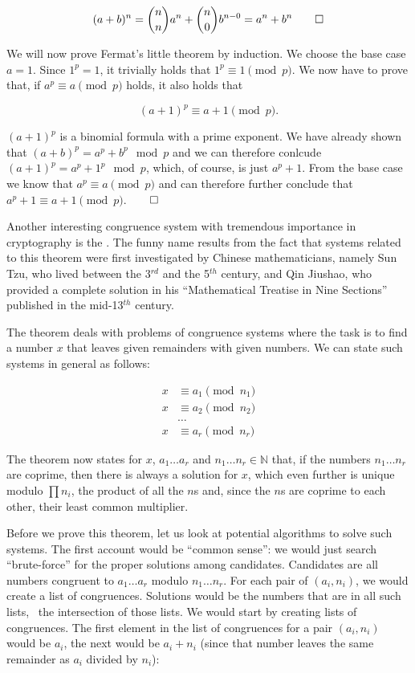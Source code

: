 \documentclass{scrreprt}
\begin{document}
\[
(a + b)^n = \binom{n}{n}a^{n} + \binom{n}{0}b^{n-0} = a^n + b^n\qed
\]

We will now prove Fermat's little theorem by induction.
We choose the base case $a = 1$.
Since $1^p = 1$, it trivially holds that $1^p \equiv 1 \pmod{p}$.
We now have to prove that, if $a^p \equiv a \pmod{p}$ holds,
it also holds that 

\begin{equation}
(a+1)^p \equiv a+1 \pmod{p}.
\end{equation}

$(a+1)^p$ is a binomial formula with a prime exponent.
We have already shown that $(a+b)^p = a^p + b^p \mod p$
and we can therefore conlcude $(a+1)^p = a^p + 1^p \mod p$,
which, of course, is just $a^p + 1$.
From the base case we know that $a^p \equiv a \pmod p$
and can therefore further conclude that 
$a^p + 1 \equiv a + 1 \pmod{p}$.$\qed$

Another interesting congruence system 
with tremendous importance in cryptography is the 
.
The funny name results from the fact
that systems related to this theorem
were first investigated by Chinese mathematicians,
namely Sun Tzu, who lived between the 3$^{rd}$ and
the 5$^{th}$ century, and Qin Jiushao,
who provided a complete solution in his
``Mathematical Treatise in Nine Sections''
published in the mid-13$^{th}$ century.

The theorem deals with problems of congruence systems
where the task is to find a number $x$ 
that leaves given remainders with given numbers.
We can state such systems in general as follows:

\begin{align*}
x & \equiv a_1 \pmod{n_1}\\
x & \equiv a_2 \pmod{n_2}\\
  & \dots\\
x & \equiv a_r \pmod{n_r}
\end{align*}

The theorem now states for $x$, $a_1\dots a_r$ 
and $n_1\dots n_r \in \mathbb{N}$ that,
if the numbers $n_1 \dots n_r$ are coprime,
then there is always a solution for $x$,
which even further is unique modulo $\prod{n_i}$,
the product of all the $n$s and,
since the $n$s are coprime to each other,
their least common multiplier.

Before we prove this theorem, 
let us look at potential algorithms
to solve such systems.
The first account would be ``common sense'':
we would just search ``brute-force'' for the proper solutions
among candidates.
Candidates are all numbers congruent to $a_1\dots a_r$
modulo $n_1\dots n_r$.
For each pair of $(a_i,n_i)$, we would create a list
of congruences.
Solutions would be the numbers that are in all such lists,
\ie\ the intersection of those lists.
We would start by creating lists of congruences.
The first element in the list of congruences
for a pair $(a_i,n_i)$ would be $a_i$,
the next would be $a_i + n_i$ (since that number
leaves the same remainder as $a_i$ divided by $n_i$):
\end{document}
